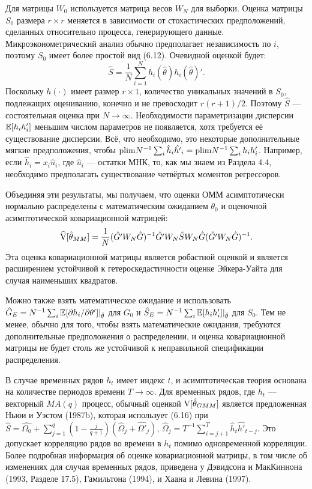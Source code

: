 Для матрицы $W_0$ используется матрица весов $W_N$ для выборки. Оценка матрицы $S_0$  размера $r \times r$ меняется в зависимости от стохастических предположений, сделанных относительно процесса, генерирующего данные. Микроэконометрический анализ обычно предполагает независимость по $i$, поэтому $S_0$ имеет более простой вид (6.12). Очевидной оценкой будет:
\begin{equation}
\hat{S}=\frac{1}{N} \sum_{i=1}^{N} h_i(\hat{\theta}) h_i(\hat{\theta})'.
\end{equation}
Поскольку $h(\cdot)$ имеет размер $r \times 1$, количество уникальных значений в $S_0$, подлежащих оцениванию, конечно и не превосходит $r(r+1)/2$. Поэтому $\hat{S}$ --- состоятельная оценка при $N \rightarrow  \infty$. Необходимости параметризации дисперсии $\mathbb{E}[h_i h'_i]$ меньшим числом параметров не появляется, хотя требуется её существование дисперсии. Всё, что необходимо, это некоторые дополнительные мягкие предположения, чтобы $\mathrm{plim } N^{-1} \sum_i \hat{h}_i \hat{h'}_i= \mathrm{plim } N^{-1} \sum_i h_i h'_i$. Например, если $\hat{h}_i=x_i \hat{u}_i$, где $\hat{u}_i$ --- остатки МНК, то, как мы знаем из Раздела 4.4, необходимо предполагать существование четвёртых моментов регрессоров.

Объединяя эти результаты, мы получаем, что оценки ОММ асимптотически нормально распределены с математическим ожиданием $\theta_0$ и оценочной асимптотической ковариационной матрицей:
\begin{equation}
\widehat{\mathrm{V}}[\hat{\theta}_{MM}]=\frac{1}{N} (\hat{G'} W_N \hat{G})^{-1} \hat{G'} W_N \hat{S}  W_N  \hat{G}(\hat{G'} W_N \hat{G})^{-1}.
\end{equation}
Эта оценка ковариационной матрицы является робастной оценкой и является расширением устойчивой к гетероскедастичности оценке Эйкера-Уайта для случая наименьших квадратов.

Можно также взять математическое ожидание и использовать $\hat{G}_{E}=N^{-1} \sum_i \mathbb{E}[\partial h_i / \partial \theta']|_{\hat{\theta}}$ для $G_0$ и $\hat{S}_{E}= N^{-1} \sum_i \mathbb{E}[h_i h'_i]|_{\hat{\theta}}$ для $S_0$. Тем не менее, обычно для того, чтобы взять математические ожидания, требуются дополнительные предположения о распределении, и оценка ковариационной матрицы не будет столь же устойчивой к неправильной спецификации распределения.

В случае временных рядов $h_t$ имеет индекс $t$, и асимптотическая теория основана на количестве периодов времени $T \rightarrow \infty$. Для временных рядов, где  $h_t$ --- векторный $MA(q)$ процесс, обычный оценкой $\mathrm{V}[\hat{\theta}_{GMM}]$ является предложенная Ньюи и Уэстом (1987b), которая использует (6.16) при $\hat{S}=\hat{\Omega_0} + \sum_{j=1}^{q}(1-\frac{j}{q+1})(\hat{\Omega}_j+\hat{\Omega'}_j)$, $\hat{\Omega}_j=T^{-1} \sum_{i=j+1}^{T} \hat{h}_t \hat{h'}_{t-j}$. Это допускает корреляцию рядов во времени в $h_t$ помимо одновременной корреляции. Более подробная информация об оценке ковариационной матрицы, в том числе об изменениях для случая временных рядов, приведена у Дэвидсона и МакКиннона (1993, Разделе 17.5), Гамильтона (1994), и Хаана и Левина (1997).

